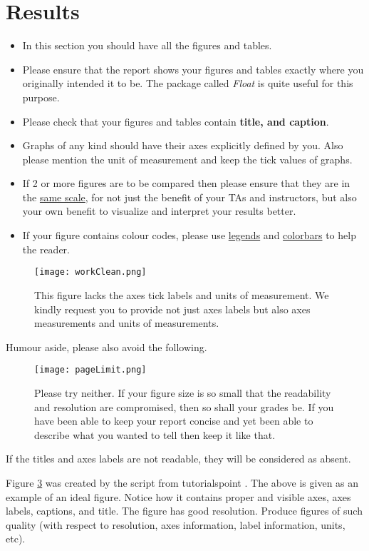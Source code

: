 \documentclass[a4paper]{article}
\begin{document}
\section{Results}
\begin{itemize}
 \item In this section you should have all the figures and tables.
 \item Please ensure that the report shows your figures and tables exactly where you originally intended it to be. 
 The package called \textit{Float} is quite useful for this purpose. 
 \item Please check that your figures and tables contain \textbf{title, and caption}.
 \item Graphs of any kind should have their axes explicitly defined by you.  Also please mention the unit of measurement and keep the tick values of graphs.
 \item If 2 or more figures are to be compared then please ensure that they are in the \underline{same scale}, for not just the benefit of your TAs and instructors, but
 also your own benefit to visualize and interpret your results better.
 \item If your figure contains colour codes, please use \underline{legends} and \underline{colorbars} to help the reader.
\end{itemize}
\begin{figure}[H]
\centering
   \texttt{[image: workClean.png]}
   \caption{This figure lacks the axes tick labels and units of measurement. We kindly request you to provide not just axes labels but also axes measurements and units of measurements.}
   \label{fig:noTicks}
\end{figure}
Humour aside, please also avoid the following.
\begin{figure}[H]
\centering
   \texttt{[image: pageLimit.png]}
   \caption{Please try neither. If your figure size is so small that the readability and resolution are compromised, then so shall your grades be. If you have been able to keep your report concise
   and yet been able to describe what you wanted to tell then keep it like that.}
   \label{fig:PageLimit}
\end{figure}
If the titles and axes labels are not readable, they will be considered as absent. 

\begin{figure}[h]
\begin{center}
\label{fig:rboxplot}
\end{center}
\end{figure}
Figure \ref{fig:rboxplot} was created by the script from tutorialspoint \cite{Rboxplot}. The above is given as an example of an ideal figure. Notice how it contains proper and visible axes, axes labels, 
captions, and title. The figure has good resolution. Produce figures of such quality (with respect to resolution, axes information, label information, units, etc).
\end{document}
